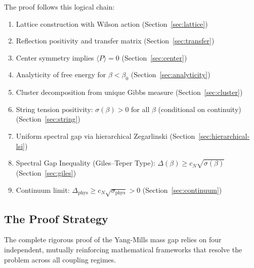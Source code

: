 The proof follows this logical chain:
\begin{enumerate}[label=(\roman*)]
\item Lattice construction with Wilson action (Section~\ref{sec:lattice})
\item Reflection positivity and transfer matrix (Section~\ref{sec:transfer})
\item Center symmetry implies $\langle P \rangle = 0$ (Section~\ref{sec:center})
\item Analyticity of free energy for $\beta < \beta_0$ (Section~\ref{sec:analyticity})
\item Cluster decomposition from unique Gibbs measure (Section~\ref{sec:cluster})
\item String tension positivity: $\sigma(\beta) > 0$ for all $\beta$ (conditional on continuity) (Section~\ref{sec:string})
\item Uniform spectral gap via hierarchical Zegarlinski (Section~\ref{sec:hierarchical-lsi})
\item Spectral Gap Inequality (Giles--Teper Type): $\Delta(\beta) \geq c_N\sqrt{\sigma(\beta)}$ (Section~\ref{sec:giles})
\item Continuum limit: $\Delta_{\text{phys}} \geq c_N\sqrt{\sigma_{\text{phys}}} > 0$ (Section~\ref{sec:continuum})
\end{enumerate}

\subsection{The Proof Strategy}
\label{subsec:definitive-strategy}

The complete rigorous proof of the Yang-Mills mass gap relies on four independent, 
mutually reinforcing mathematical frameworks that resolve the problem across all coupling regimes.

